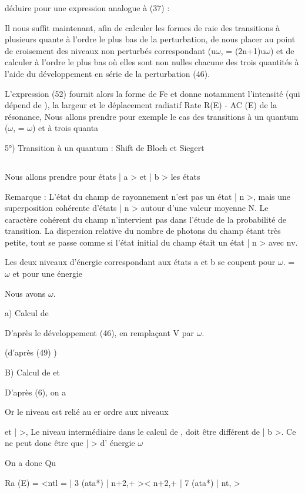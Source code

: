 déduire pour  une expression analogue à (37) :

Il nous suffit maintenant, afin de calculer les formes de raie des transitions
à plusieurs quante à l'ordre le plus bas de la perturbation, de nous placer au
point de croisement des niveaux non perturbés correspondant (u$\omega$, = (2n+1)u$\omega$) et
de calculer à l'ordre le plus bas où elles sont non nulles chacune des trois
quantités  à l'aide du développement en série de la perturbation (46).

L'expression (52) fournit alors la forme de Fe et donne notamment l'intensité (qui dépend de ),
la largeur  et le déplacement radiatif Rate R(E) - AC (E) de la résonance, Nous allons prendre pour
exemple le cas des transitions à un quantum ($\omega$, = $\omega$) et à trois quanta

5°) Transition à un quantum : Shift de Bloch et Siegert
\subsection{}%
Nous allons prendre pour états | a > et | b > les états

Remarque : L'état du champ de rayonnement n'est pas un état | n >, mais une superposition cohérente d'états | n > autour d'une valeur moyenne N. Le caractère
cohérent du champ n'intervient pas dans l'étude de la probabilité de transition.
La dispersion relative du nombre de photons du champ  étant très
petite, tout se passe comme si l'état initial du champ était un état | n >
avec nv.

Les deux niveaux d'énergie correspondant aux états a et b se coupent
pour $\omega$. = $\omega$ et pour une énergie 

Nous avons $\omega$.

a) Calcul de 

D'après le développement (46), en remplaçant V par
$\omega$.

(d'après (49) )


B) Calcul de  et 

D'après (6), on a

Or le niveau  est relié au er ordre aux niveaux

et |  >, Le niveau intermédiaire dans le calcul de ,  doit être différent de | b >.
Ce ne peut donc être que |  > d' énergie $\omega$

On a donc
Qu

Ra (E) = <ntl = | 3 (ata*) | n+2,+ >< n+2,+ | 7 (ata*) | nt, >

